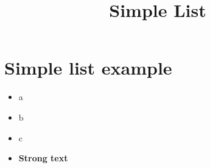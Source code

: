 \documentclass[a4paper,11pt,oneside,openany,report]{jsbook}
\title{Simple List}
\begin{document}
\maketitle
\chapter{Simple list example}\label{ch:Simplelistexample}
\begin{itemize}
\item a
\item b
\item c
\item \textbf{Strong text}
\end{itemize}
\end{document}
